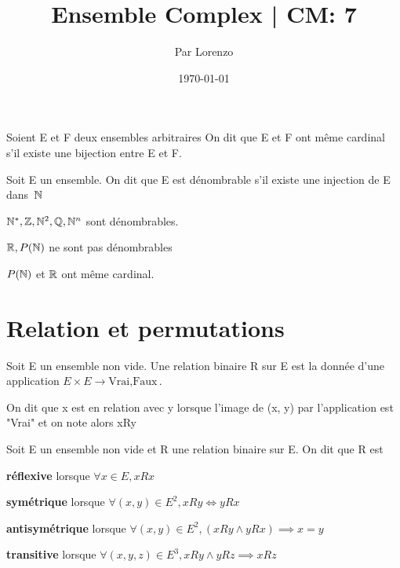 \documentclass[a4paper, 12pt]{article}
\title{Ensemble Complex | CM: 7}
\author{Par Lorenzo}
\date{\today}
\begin{document}
\maketitle

\begin{definition}
    Soient E et F deux ensembles arbitraires On dit que E et F ont même cardinal
    s'il existe une bijection entre E et F.

    Soit E un ensemble. On dit que E est dénombrable s'il existe une injection de E dans~$\mathbb{N}$
\end{definition}

\begin{proposition}
    $\mathbb{N}^*, \mathbb{Z}, \mathbb{N}^2, \mathbb{Q}, \mathbb{N}^n$ sont dénombrables.

    $\mathbb{R}, P(\mathbb{N})$ ne sont pas dénombrables

    $P(\mathbb{N})$ et $\mathbb{R}$ ont même cardinal.

\end{proposition}

\section{Relation et permutations}

\begin{definition}
    Soit E un ensemble non vide. Une relation binaire R sur E est la donnée d'une application
    $E \times E \to {\text{Vrai}, \text{Faux}}$.

    On dit que x est en relation avec y lorsque l'image de (x, y) par l'application
    est "Vrai" et on note alors xRy
\end{definition}

\begin{remark}
\end{remark}

\begin{definition}
    Soit E un ensemble non vide et R une relation binaire sur E. On dit que R est

    \item \textbf{réflexive} lorsque $\forall x \in E, xRx$
    \item \textbf{symétrique} lorsque $\forall(x, y) \in E^2, xRy \iff yRx$
    \item \textbf{antisymétrique} lorsque $\forall (x, y) \in E^2, (xRy \land yRx) \implies x = y$
    \item \textbf{transitive} lorsque $\forall (x, y, z) \in E^3, xRy \land yRz \implies xRz$
\end{definition}
\end{document}

